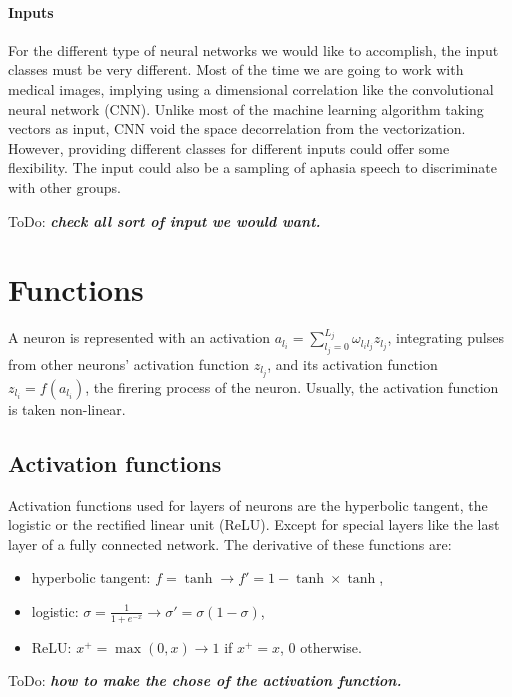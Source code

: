 \documentclass[final, paper=letter,5p,times,twocolumn]{elsarticle}
\newcommand{\ToDo}[1]{ToDo: \textbf{\textit{#1}}}
\begin{document}
\paragraph{Inputs}{For the different type of neural networks we would like to accomplish, the input classes must be very different. Most of the time we are going to work with medical images, implying using a dimensional correlation like the convolutional neural network (CNN). Unlike most of the machine learning algorithm taking vectors as input, CNN void the space decorrelation from the vectorization. However, providing different classes for different inputs could offer some flexibility. The input could also be a sampling of aphasia speech to discriminate with other groups.}

\ToDo{check all sort of input we would want.} \\

\section{Functions}

A neuron is represented with an activation $a_{l_{i}} = \sum_{l_{j} = 0}^{L_{j}} \omega_{l_{i}l_{j}} z_{l_{j}}$, integrating pulses from other neurons' activation function $z_{l_{j}}$, and its activation function $z_{l_{i}} = f(a_{l_{i}})$, the firering process of the neuron. Usually, the activation function is taken non-linear. 

\subsection{Activation functions}

Activation functions used for layers of neurons are the hyperbolic tangent, the logistic or the rectified linear unit (ReLU). Except for special layers like the last layer of a fully connected network. The derivative of these functions are:

\begin{itemize}
\item hyperbolic tangent: $f = \tanh \rightarrow f' = 1 - \tanh \times \tanh$,
\item logistic: $\sigma = \frac{1}{1+e^{-x}} \rightarrow \sigma' = \sigma (1 - \sigma)$,
\item ReLU: $x^{+} = \max(0,x) \rightarrow 1$ if $x^{+} = x$, 0 otherwise.
\end{itemize}
\ToDo{how to make the chose of the activation function.}
\end{document}
